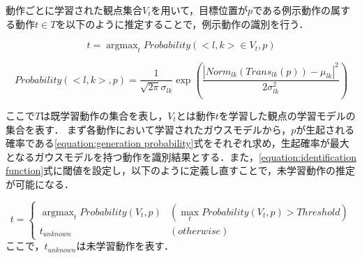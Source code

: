 動作ごとに学習された観点集合$V_{t}$を用いて，目標位置が$p$である例示動作の属する動作$t∈T$を以下のように推定することで，例示動作の識別を行う．

\begin{equation}
	\label{equation:identification function}
	t =  \mathop{\arg\max}_{t}Probability(<l , k>∈V_{t} , p)
\end{equation}

\begin{equation}
	\label{equation:generation probability}
	Probability(<l , k> , p) = \frac{1}{\sqrt{2\pi}σ_{lk}}\exp \left(\frac{|Norm_{lk}(Trans_{lk}(p))-μ_{lk}|^2}{2σ_{lk}^2}\right)
\end{equation}

ここで$T$は既学習動作の集合を表し，$V_{t}$とは動作$t$を学習した観点の学習モデルの集合を表す．
まず各動作において学習されたガウスモデルから，$p$が生起される確率である\ref{equation:generation probability}式をそれぞれ求め，生起確率が最大となるガウスモデルを持つ動作を識別結果とする．また，\ref{equation:identification function}式に閾値を設定し，以下のように定義し直すことで，未学習動作の推定が可能になる．

\begin{equation}
	\label{equation:identification function2}
	t =
	\begin{cases}
		\mathop{\arg\max}_{t}Probability(V_{t} , p)		& (\mathop{\max}_{t}Probability(V_{t} , p) > Threshold) \\
		t_{unknown}					 			& (otherwise)
	\end{cases}	
\end{equation}
ここで，$t_{unknown}$は未学習動作を表す．
